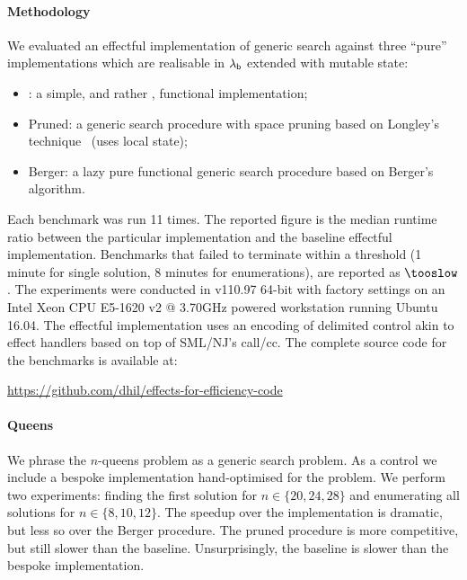 \documentclass[12pt,phd,lfcs,twoside,openright,logo,leftchapter,normalheadings]{infthesis}
\theoremstyle{plain}
\theoremstyle{definition}
\begin{document}
\paragraph{Methodology}
We evaluated an effectful implementation of generic search against
three ``pure'' implementations which are realisable in $\lambda_{\mathsf{b}}$
extended with mutable state:
%
\begin{itemize}
\item \Naive: a simple, and rather \naive, functional implementation;
\item Pruned: a generic search procedure with space pruning based on
  Longley's technique~\cite{Longley99} (uses local state);
\item Berger: a lazy pure functional generic search procedure based on
  Berger's algorithm.
\end{itemize}
%
Each benchmark was run 11 times. The reported figure is the median
runtime ratio between the particular implementation and the baseline
effectful implementation. Benchmarks that failed to terminate within a
threshold (1 minute for single solution, 8 minutes for enumerations),
are reported as $\tooslow$. The experiments were conducted in
\citet{smlnj} v110.97 64-bit with factory settings on an Intel Xeon
CPU E5-1620 v2 @ 3.70GHz powered workstation running Ubuntu 16.04. The
effectful implementation uses an encoding of delimited control akin to
effect handlers based on top of SML/NJ's call/cc.
%
The complete source code for the benchmarks is available at:
\begin{center}
  \url{https://github.com/dhil/effects-for-efficiency-code}
\end{center}
%

\paragraph{Queens}
We phrase the $n$-queens problem as a generic search problem. As a
control we include a bespoke implementation hand-optimised for the
problem. We perform two experiments: finding the first solution for $n
\in \{20,24,28\}$ and enumerating all solutions for $n \in
\{8,10,12\}$. The speedup over the \naive implementation is dramatic,
but less so over the Berger procedure. The pruned procedure is more
competitive, but still slower than the baseline. Unsurprisingly, the
baseline is slower than the bespoke implementation.
\end{document}
